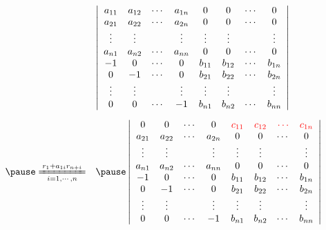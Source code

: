 \begin{frame}
  \begin{footnotesize}
    $$
    \begin{array}{rl}
      & \left|
        \begin{array}{cccccccc}
          a_{11} & a_{12} & \cd &  a_{1n} & 0 & 0 & \cd & 0\\
          a_{21} & a_{22} & \cd &  a_{2n} & 0 & 0 & \cd & 0\\
          \vd   & \vd   &     & \vd    & \vd & \vd & & \vd\\
          a_{n1} & a_{n2} & \cd &  a_{nn} & 0 & 0 & \cd & 0\\
          -1    & 0     & \cd &   0    & b_{11} & b_{12} & \cd & b_{1n} \\
          0 & -1 & \cd & 0& b_{21} & b_{22} & \cd & b_{2n} \\
          \vd&\vd & & \vd &  \vd  &\vd &  & \vd   \\
          0 & 0 & \cd & -1 & b_{n1} & b_{n2} &\cd     & b_{nn}
        \end{array}
                                                        \right|  \\[0.8in] \pause
      \xlongequal[i=1,\cd,n]{r_1+a_{1i}r_{n+i}}
      & \pause \left|
        \begin{array}{cccccccc}
          0     & 0     & \cd &  0     & \red{c_{11}} & \red{c_{12}} & \red{\cd} & \red{c_{1n}}\\
          a_{21} & a_{22} & \cd &  a_{2n} & 0 & 0 & \cd & 0\\
          \vd   & \vd   &     & \vd    & \vd & \vd & & \vd\\
          a_{n1} & a_{n2} & \cd &  a_{nn} & 0 & 0 & \cd & 0\\
          -1    & 0     & \cd &   0    & b_{11} & b_{12} & \cd & b_{1n} \\
          0 & -1 & \cd & 0& b_{21} & b_{22} & \cd & b_{2n} \\
          \vd&\vd & & \vd &  \vd  &\vd &  & \vd   \\
          0 & 0 & \cd & -1 & b_{n1} & b_{n2} &\cd     & b_{nn}
        \end{array}
                                                        \right|

    \end{array}
    $$
  \end{footnotesize}
\end{frame}

